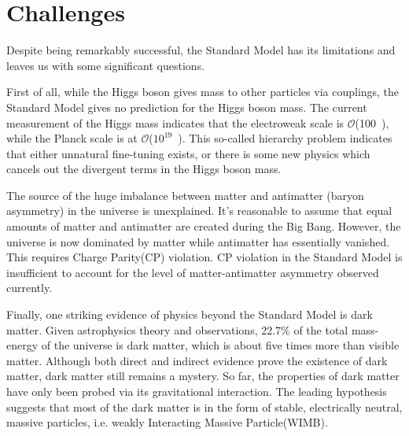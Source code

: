 \section{Challenges}
\par Despite being remarkably successful, the Standard Model has its limitations and leaves us with some significant questions.

\par First of all, while the Higgs boson gives mass to other particles via couplings, the Standard Model gives no prediction for
the Higgs boson mass. The current measurement of the Higgs mass indicates that the electroweak scale is $\mathcal{O}$(100~\GeV), 
while the Planck scale is at $\mathcal{O}$($10^{19}$~\GeV). This so-called hierarchy problem indicates that either unnatural fine-tuning exists, or there 
is some new physics which cancels out the divergent terms in the Higgs boson mass.



\par The source of the huge imbalance between matter and antimatter (baryon asymmetry) in the universe is unexplained. 
It's reasonable to assume that equal amounts of matter and antimatter are created during the Big Bang. However, 
the universe is now dominated by matter while antimatter has essentially vanished. This requires Charge Parity(CP) violation.
CP violation in the Standard Model is insufficient to account for the level of matter-antimatter asymmetry observed currently.

\par Finally, one striking evidence of physics beyond the Standard Model is dark matter. Given astrophysics theory and observations, 
22.7\% of the total mass-energy of the universe is dark matter, which is about five times more than visible matter. 
Although both direct and indirect evidence prove the existence of dark matter, dark matter still remains a mystery. 
So far, the properties of dark matter have only been probed via its gravitational interaction. The leading hypothesis suggests that 
most of the dark matter is in the form of stable, electrically neutral, massive particles, i.e. weakly Interacting Massive Particle(WIMB).

